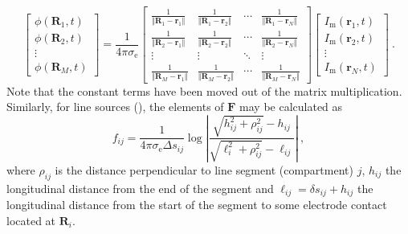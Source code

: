 \begin{equation}
\begin{bmatrix}
\phi(\mathbf{R}_1, t) \\
\phi(\mathbf{R}_2, t) \\
\vdots \\
\phi(\mathbf{R}_M, t)
\end{bmatrix}
= \frac{1}{4\pi\sigma_\mathrm{e}}
\begin{bmatrix}
\frac{1}{\Vert\mathbf{R}_1 - \mathbf{r}_1\Vert} & \frac{1}{\Vert\mathbf{R}_1 - \mathbf{r}_2\Vert} & \cdots & \frac{1}{\Vert\mathbf{R}_1 - \mathbf{r}_N\Vert} \\
\frac{1}{\Vert\mathbf{R}_2 - \mathbf{r}_1\Vert} & \frac{1}{\Vert\mathbf{R}_2 - \mathbf{r}_2\Vert} & \cdots & \frac{1}{\Vert\mathbf{R}_2 - \mathbf{r}_N\Vert} \\
\vdots & \vdots & \ddots & \vdots \\
\frac{1}{\Vert\mathbf{R}_M - \mathbf{r}_1\Vert} & \frac{1}{\Vert\mathbf{R}_M - \mathbf{r}_2\Vert} & \cdots & \frac{1}{\Vert\mathbf{R}_M - \mathbf{r}_N\Vert}
\end{bmatrix}
\begin{bmatrix}
I_\mathrm{m}(\mathbf{r}_1, t) \\
I_\mathrm{m}(\mathbf{r}_2, t) \\
\vdots \\
I_\mathrm{m}(\mathbf{r}_N, t)
\end{bmatrix} ~.
\end{equation}
%
Note that the constant terms have been moved out of the matrix multiplication.
Similarly, for line sources (), the elements of $\mathbf{F}$ may be calculated as
%
\begin{equation}
f_{ij} = \frac{1}{4\pi \sigma_\mathrm{e} \Delta s_{ij}} \log \left| \frac{\sqrt{h_{ij}^2+\rho_{ij}^2}-h_{ij}}{\sqrt{\ell_i^2+\rho_{ij}^2}-\ell_{ij}} \right| ~,
\label{eq:LFPy:linesources}
\end{equation}
%
where $\rho_{ij}$ is the distance perpendicular to line segment (compartment) $j$,
$h_{ij}$ the longitudinal distance from the end of the segment
and $\ell_{ij} = \delta s_{ij} + h_{ij}$ the longitudinal distance from the start of the segment to some electrode contact located at $\mathbf{R}_i$.

